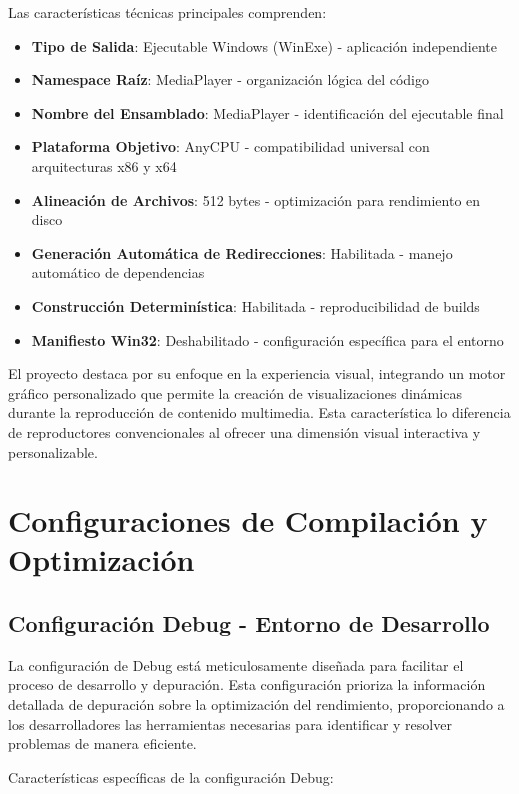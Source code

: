 \documentclass[a4paper]{article}
\begin{document}
Las características técnicas principales comprenden:

\begin{itemize}
\item \textbf{Tipo de Salida}: Ejecutable Windows (WinExe) - aplicación independiente
\item \textbf{Namespace Raíz}: MediaPlayer - organización lógica del código
\item \textbf{Nombre del Ensamblado}: MediaPlayer - identificación del ejecutable final
\item \textbf{Plataforma Objetivo}: AnyCPU - compatibilidad universal con arquitecturas x86 y x64
\item \textbf{Alineación de Archivos}: 512 bytes - optimización para rendimiento en disco
\item \textbf{Generación Automática de Redirecciones}: Habilitada - manejo automático de dependencias
\item \textbf{Construcción Determinística}: Habilitada - reproducibilidad de builds
\item \textbf{Manifiesto Win32}: Deshabilitado - configuración específica para el entorno
\end{itemize}

El proyecto destaca por su enfoque en la experiencia visual, integrando un motor gráfico personalizado que permite la creación de visualizaciones dinámicas durante la reproducción de contenido multimedia. Esta característica lo diferencia de reproductores convencionales al ofrecer una dimensión visual interactiva y personalizable.

\section{Configuraciones de Compilación y Optimización}

\subsection{Configuración Debug - Entorno de Desarrollo}

La configuración de Debug está meticulosamente diseñada para facilitar el proceso de desarrollo y depuración. Esta configuración prioriza la información detallada de depuración sobre la optimización del rendimiento, proporcionando a los desarrolladores las herramientas necesarias para identificar y resolver problemas de manera eficiente.

Características específicas de la configuración Debug:
\end{document}
